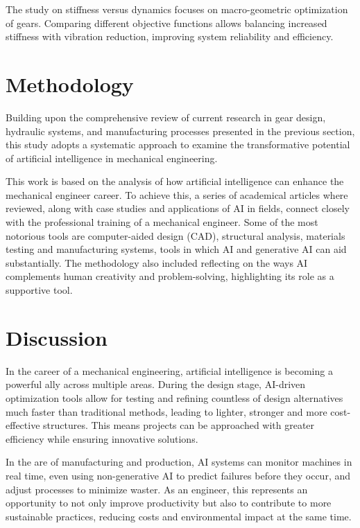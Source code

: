 \documentclass{article}
\begin{document}
The study on stiffness versus dynamics \cite{marafona2024stiffness} focuses on macro-geometric optimization of gears.
Comparing different objective functions allows balancing increased stiffness with vibration reduction, improving system reliability and efficiency.

\section*{Methodology}

Building upon the comprehensive review of current research in gear design, hydraulic systems, and manufacturing processes presented in the previous section, this study adopts a systematic approach to examine the transformative potential of artificial intelligence in mechanical engineering.

This work is based on the analysis of how artificial intelligence can enhance the mechanical engineer career.
To achieve this, a series of academical articles where reviewed, along with case studies and applications of AI in fields, connect closely with the professional training of a mechanical engineer.
Some of the most notorious tools are computer-aided design (CAD), structural analysis, materials testing and manufacturing systems, tools in which AI and generative AI can aid substantially.
The methodology also included reflecting on the ways AI complements human creativity and problem-solving, highlighting its role as a supportive tool.

\section*{Discussion}

In the career of a mechanical engineering, artificial intelligence is becoming a powerful ally across multiple areas.
During the design stage, AI-driven optimization tools allow for testing and refining countless of design alternatives much faster than traditional methods, leading to lighter, stronger and more cost-effective structures.
This means projects can be approached with greater efficiency while ensuring innovative solutions.

In the are of manufacturing and production, AI systems can monitor machines in real time, even using non-generative AI to predict failures before they occur, and adjust processes to minimize waster.
As an engineer, this represents an opportunity to not only improve productivity but also to contribute to more sustainable practices, reducing costs and environmental impact at the same time.
\end{document}
